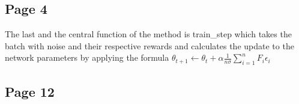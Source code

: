 \subsection{Page 4}

The last and the central function of the method is train\_step which takes the
batch with noise and their respective rewards and calculates the update to the
network parameters by applying the formula
\begin{math}\theta_{t+1} \leftarrow \theta_t+\alpha\frac{1}{n\sigma}\sum_{i=1}^nF_i\epsilon_i\end{math}


\subsection{Page 12}


